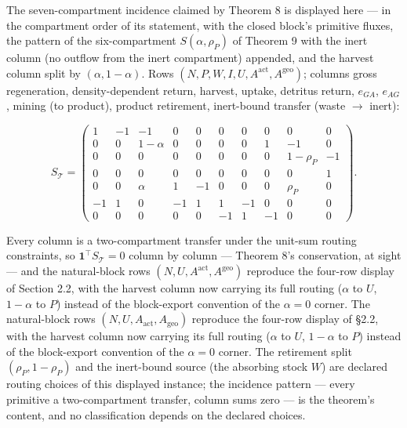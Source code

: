 \documentclass[11pt]{article}
\begin{document}
The seven-compartment incidence claimed by Theorem 8 is displayed here --- in the compartment order of its statement, with the closed block's primitive fluxes, the pattern of the six-compartment \(S(\alpha,\rho_P)\) of Theorem 9 with the inert column (no outflow from the inert compartment) appended, and the harvest column split by \((\alpha,1-\alpha)\). Rows \((N,\allowbreak{} P,\allowbreak{} W,\allowbreak{} I,\allowbreak{} U,\allowbreak{} A^{\mathrm{act}},\allowbreak{} A^{\mathrm{geo}})\); columns gross regeneration, density-dependent return, harvest, uptake, detritus return, \(e_{GA}\), \(e_{AG}\), mining (to product), product retirement, inert-bound transfer (waste \(\to\) inert): 

$$S_{\mathcal{T}} = \begin{pmatrix} 1 & -1 & -1 & 0 & 0 & 0 & 0 & 0 & 0 & 0 \\ 0 & 0 & 1-\alpha & 0 & 0 & 0 & 0 & 1 & -1 & 0 \\ 0 & 0 & 0 & 0 & 0 & 0 & 0 & 0 & 1-\rho_P & -1 \\ 0 & 0 & 0 & 0 & 0 & 0 & 0 & 0 & 0 & 1 \\ 0 & 0 & \alpha & 1 & -1 & 0 & 0 & 0 & \rho_P & 0 \\ -1 & 1 & 0 & -1 & 1 & 1 & -1 & 0 & 0 & 0 \\ 0 & 0 & 0 & 0 & 0 & -1 & 1 & -1 & 0 & 0 \end{pmatrix}.$$

 Every column is a two-compartment transfer under the unit-sum routing constraints, so \(\mathbf{1}^\top S_{\mathcal{T}} =\allowbreak{} 0\) column by column --- Theorem 8's conservation, at sight --- and the natural-block rows \((N,\allowbreak{} U,\allowbreak{} A^{\mathrm{act}},\allowbreak{} A^{\mathrm{geo}})\) reproduce the four-row display of Section 2.2, with the harvest column now carrying its full routing (\(\alpha\) to \(U\), \(1-\alpha\) to \(P\)) instead of the block-export convention of the \(\alpha = 0\) corner. The natural-block rows \((N,\allowbreak{}U,\allowbreak{}A_{\mathrm{act}},\allowbreak{}A_{\mathrm{geo}})\) reproduce the four-row display of \S2.2, with the harvest column now carrying its full routing (\(\alpha\) to \(U\), \(1-\alpha\) to \(P\)) instead of the block-export convention of the \(\alpha=0\) corner. The retirement split \((\rho_P, 1-\rho_P)\) and the inert-bound source (the absorbing stock \(W\)) are declared routing choices of this displayed instance; the incidence pattern --- every primitive a two-compartment transfer, column sums zero --- is the theorem's content, and no classification depends on the declared choices.
\end{document}
